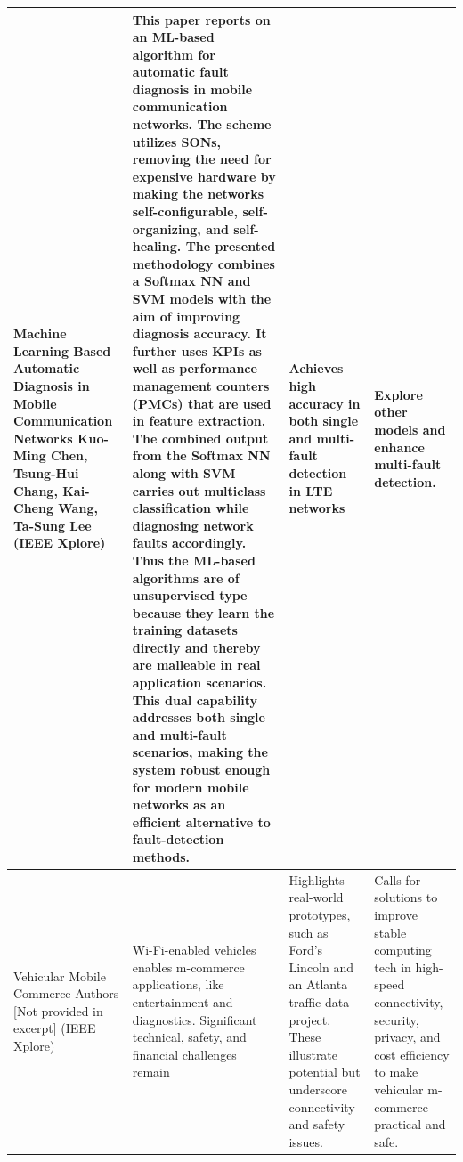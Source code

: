 \begin{longtable}{|p{}|p{}|p{}|p{}|}
\newpage
\hline
Machine Learning Based Automatic Diagnosis in Mobile Communication Networks
\newline
Kuo-Ming Chen, Tsung-Hui Chang, Kai-Cheng Wang, Ta-Sung Lee
\newline
(IEEE Xplore) &
This paper reports on an ML-based algorithm for automatic fault diagnosis in mobile communication networks. The scheme utilizes SONs, removing the need for expensive hardware by making the networks self-configurable, self-organizing, and self-healing. The presented methodology combines a Softmax NN and SVM models with the aim of improving diagnosis accuracy.
\newline
It further uses KPIs as well as performance management counters (PMCs) that are used in feature extraction. The combined output from the Softmax NN along with SVM carries out multiclass classification while diagnosing network faults accordingly. Thus the ML-based algorithms are of unsupervised type because they learn the training datasets directly and thereby are malleable in real application scenarios.
\newline
This dual capability addresses both single and multi-fault scenarios, making the system robust enough for modern mobile networks as an efficient alternative to fault-detection methods. &
Achieves high accuracy in both single and multi-fault detection in LTE networks &
Explore other models and enhance multi-fault detection. \\
\hline

\newpage
\hline
Vehicular Mobile Commerce
\newline
Authors [Not provided in excerpt]
\newline
(IEEE Xplore) &
Wi-Fi-enabled vehicles enables m-commerce applications, like entertainment and diagnostics. Significant technical, safety, and financial challenges remain &
Highlights real-world prototypes, such as Ford's Lincoln and an Atlanta traffic data project. These illustrate potential but underscore connectivity and safety issues. &
Calls for solutions to improve stable computing tech in high-speed connectivity, security, privacy, and cost efficiency to make vehicular m-commerce practical and safe. \\
\hline


\end{longtable}
